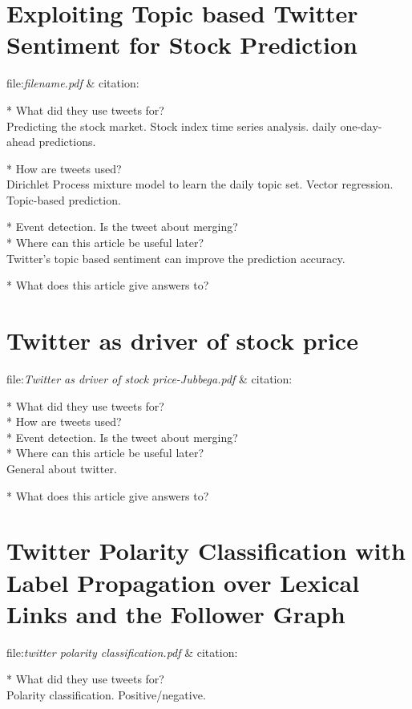 \section{Exploiting Topic based Twitter Sentiment for Stock Prediction}
file:\textit{filename.pdf} & citation:\cite[]{mukherjee13}  

* What did they use tweets for?\\
Predicting the stock market. 
Stock index time series analysis. 
daily one-day-ahead predictions. 

* How are tweets used?\\
Dirichlet Process mixture model to learn the daily topic set.
Vector regression. 
Topic-based prediction. 

* Event detection. Is the tweet about merging? \\
* Where can this article be useful later? \\
Twitter’s topic based sentiment can improve the prediction accuracy.
\cite[p28]{mukherjee13}

* What does this article give answers to?\\

\section{Twitter as driver of stock price}
file:\textit{Twitter as driver of stock price-Jubbega.pdf} &
citation:\cite[]{annikajubbega11:twitter_driver_stock_price}

* What did they use tweets for?\\
* How are tweets used?\\
* Event detection. Is the tweet about merging? \\
* Where can this article be useful later? \\
General about twitter.
 
* What does this article give answers to?\\

\section{Twitter Polarity Classification with Label Propagation over Lexical Links and the Follower Graph}
file:\textit{twitter polarity classification.pdf} & citation:\cite[]{sperious11}

* What did they use tweets for?\\
Polarity classification. Positive/negative. 

